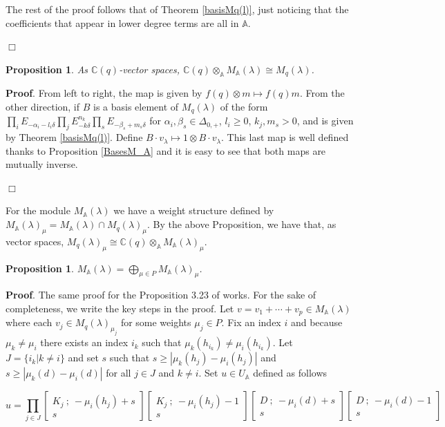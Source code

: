 \documentclass[12pt]{amsart}
\newtheorem{prop}[thm]{Proposition}
\numberwithin{equation}{section}
\newcommand{\dem }{\noindent\textbf{Proof}. }
\newcommand{\findem }{\hfill $\Box$ \vskip0.5cm }
\newcommand{\C}{\ensuremath{\mathbb{C}}}
\newcommand{\A}{\ensuremath{\mathbb{A}}}
\begin{document}
The rest of the proof follows that of Theorem \ref{basisMq(l)}, just noticing that the coefficients that appear in lower degree terms are all in $\A$.

\findem

\begin{prop}\label{CoeffM_AM_q}
    As $\C(q)$-vector spaces, $\C(q)\otimes_{\A}M_{\A}(\lambda) \cong M_q(\lambda)$.
\end{prop}

\dem From left to right, the map is given by $f(q) \otimes m \mapsto f(q)m$. From the other direction, if $B$ is a basis element of $M_q(\lambda)$ of the form $\prod_i E_{-\alpha_i-l_i\delta} \prod_j E_{-k\delta}^{n_k} \prod_s E_{-\beta_s + m_s\delta}$ for $\alpha_i, \beta_s \in \Delta_{0,+}$, $l_i\geq 0$, $k_j, m_s>0$, and is given by Theorem \ref{basisMq(l)}. Define $B\cdot v_\lambda \mapsto 1\otimes B\cdot v_\lambda$. This last map is well defined thanks to Proposition \ref{BasesM_A} and it is easy to see that both maps are mutually inverse. 

\findem

For the module $M_{\A}(\lambda)$ we have a weight structure defined by $M_{\A}(\lambda)_{\mu} = M_{\A}(\lambda)\cap M_q(\lambda)_\mu$. By the above Proposition, we have that, as vector spaces, $M_q(\lambda)_\mu \cong \C(q)\otimes_{\A} M_{\A}(\lambda)_{\mu}$.


\begin{prop}
    $M_{\A}(\lambda) = \displaystyle \bigoplus_{\mu \in P} M_{\A}(\lambda)_\mu$.
\end{prop}

\dem The same proof for the Proposition 3.23 of \cite{BKMe} works. For the sake of completeness, we write the key steps in the proof. Let $v = v_1 + \cdots + v_p \in M_{\A}(\lambda)$ where each $v_j \in M_{q}(\lambda)_{\mu_j}$ for some weights $\mu_j \in P$. Fix an index $i$ and because $\mu_k \neq \mu_i$ there exists an index $i_k$ such that $\mu_k(h_{i_k}) \neq \mu_i(h_{i_k})$. Let $J = \{i_k | k \neq i\}$ and set $s$ such that $s\geq |\mu_k(h_j) - \mu_i(h_j)|$ and $s\geq |\mu_k(d) - \mu_i(d)|$ for all $j\in J$ and $k\neq i$. Set $u\in U_{\A}$ defined as follows

\[ u =  \prod_{j \in J} \begin{bmatrix} K_j \ ;\  -\mu_i(h_j) +s \\ s \end{bmatrix}  \begin{bmatrix} K_j \ ;\  -\mu_i(h_j) - 1 \\ s \end{bmatrix}  \begin{bmatrix} D \ ;\  -\mu_i(d) +s \\ s \end{bmatrix} \begin{bmatrix} D \ ;\  -\mu_i(d) -1 \\ s \end{bmatrix} \]
\end{document}
